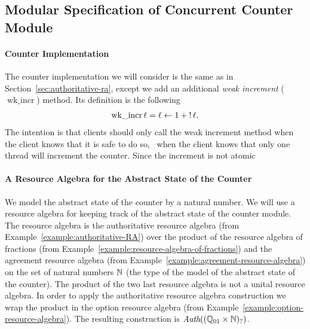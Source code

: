 \newcommand{\wkincrC}{\operatorname{wk{\_}incr}}
\newcommand{\Cnt}{\operatorname{Cnt}}

\subsection{Modular Specification of Concurrent Counter Module}
\label{sec:modular-conter}

\paragraph{Counter Implementation}

The counter implementation we will consider is the same as in Section~\ref{sec:authoritative-ra}, except we add an additional \emph{weak increment} ($\wkincrC$) method.
Its definition is the following
\begin{align*}
  \wkincrC \ell = \ell \gets  1 + \deref \ell.
\end{align*}
The intention is that clients should only call the weak increment method when the client knows that it is safe to do so, \ie\ when the client knows that only one thread will increment the counter.
Since the increment is not atomic 

\renewcommand{\Cnt}{\operatorname{Cnt}}
\newcommand{\abstractstatefrac}[3]{#1 \Mapsto\kern-0.5ex\tfrac{1}{#2} #3}
\newcommand{\abstractstate}[3]{#1 \Mapsto^{#2}_{\circ} #3}
\newcommand{\abstractstatefullfrag}[2]{#1 \Mapsto_{\circ} #2}
\newcommand{\abstractstateauth}[2]{#1 \Mapsto_{\bullet} #2}
\newcommand{\CntInvName}{c}
\newcommand{\CntInv}{\operatorname{CntInv}}

\paragraph{A Resource Algebra for the Abstract State of the Counter}

We model the abstract state of the counter by a natural number.
We will use a resource algebra for keeping track of the abstract state of the counter module.
The resource algebra is the authoritative resource algebra (from Example~\ref{example:authoritative-RA}) over the product of the resource algebra of fractions (from Example~\ref{example:resource-algebra-of-fractions}) and the agreement resource algebra (from Example~\ref{example:agreement-resource-algebra}) on the set of natural numbers $\mathbb{N}$ (the type of the model of the abstract state of the counter).
The product of the two last resource algebra is not a unital resource algebra.
In order to apply the authoritative resource algebra construction we wrap the product in the option resource algebra (from Example~\ref{example:option-resource-algebra}).
The resulting construction is $\textit{Auth}((\mathbb{Q}_{01} \times \mathbb{N})_?)$.

